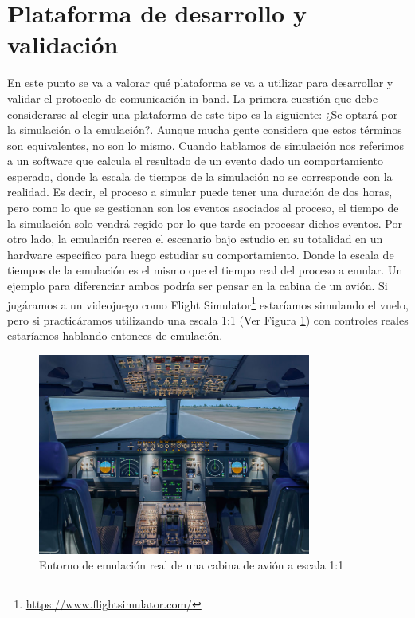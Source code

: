 \section{Plataforma de desarrollo y validación}
\label{sec:ana_mininet_wifi}

En este punto se va a valorar qué plataforma se va a utilizar para desarrollar y validar el protocolo de comunicación in-band. La primera cuestión que debe considerarse al elegir una plataforma de este tipo es la siguiente: ¿Se optará por la simulación o la emulación?. Aunque mucha gente considera que estos términos son equivalentes, no son lo mismo. Cuando hablamos de simulación nos referimos a un software que calcula el resultado de un evento dado un comportamiento esperado, donde la escala de tiempos de la simulación no se corresponde con la realidad. Es decir, el proceso a simular puede tener una duración de dos horas, pero como lo que se gestionan son los eventos asociados al proceso, el tiempo de la simulación solo vendrá regido por lo que tarde en procesar dichos eventos. Por otro lado, la emulación recrea el escenario bajo estudio en su totalidad en un hardware específico para luego estudiar su comportamiento. Donde la escala de tiempos de la emulación es el mismo que el tiempo real del proceso a emular. Un ejemplo para diferenciar ambos podría ser pensar en la cabina de un avión. Si jugáramos a un videojuego como Flight Simulator\footnote{\url{https://www.flightsimulator.com/}} estaríamos simulando el vuelo, pero si practicáramos utilizando una escala 1:1 (Ver Figura \ref{fig:emu_simu}) con controles reales estaríamos hablando entonces de emulación.\\

\begin{figure}[ht!]
    \centering
    \includegraphics[width=0.8\textwidth]{archivos/img/analisis/emu_simu.jpeg}
    \caption{Entorno de emulación real de una cabina de avión a escala 1:1 \cite{emusim}}
    \label{fig:emu_simu}
\end{figure}

